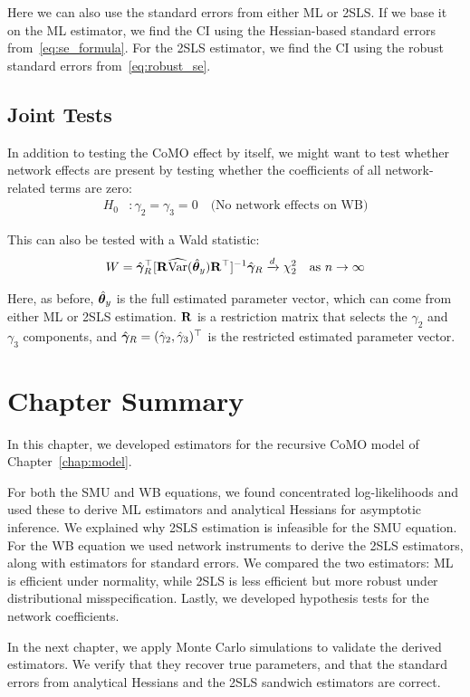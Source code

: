 Here we can also use the standard errors from either ML or 2SLS\@. If we base it on the ML estimator, we find the CI using the Hessian-based standard errors from~\eqref{eq:se_formula}. For the 2SLS estimator, we find the CI using the robust standard errors from~\eqref{eq:robust_se}.

\subsection{Joint Tests}

In addition to testing the CoMO effect by itself, we might want to test whether network effects are present by testing whether the coefficients of all network-related terms are zero:
\begin{align}
    H_0&: \gamma_2 = \gamma_3 = 0 \quad \text{(No network effects on WB)}
\end{align}

This can also be tested with a Wald statistic:
\begin{equation}
    W = \hat{\bm{\gamma}}_R^\top[\mathbf{R}\widehat{\operatorname{Var}}(\hat{\bm{\theta}}_y)\mathbf{R}^\top]^{-1}\hat{\bm{\gamma}}_R \xrightarrow{d} \chi^2_2 \quad \text{as } n \to \infty
\end{equation}

Here, as before, $\hat{\bm{\theta}}_y$ is the full estimated parameter vector, which can come from either ML or 2SLS estimation. $\mathbf{R}$ is a restriction matrix that selects the $\gamma_2$ and $\gamma_3$ components, and $\hat{\bm{\gamma}}_R = (\hat\gamma_2, \hat\gamma_3)^\top$ is the restricted estimated parameter vector.

\section{Chapter Summary}
\label{sec:est:summary}
In this chapter, we developed estimators for the recursive CoMO model of Chapter~\ref{chap:model}.

For both the SMU and WB equations, we found concentrated log-likelihoods and used these to derive ML estimators and analytical Hessians for asymptotic inference. We explained why 2SLS estimation is infeasible for the SMU equation. For the WB equation we used network instruments to derive the 2SLS estimators, along with estimators for standard errors. We compared the two estimators: ML is efficient under normality, while 2SLS is less efficient but more robust under distributional misspecification. Lastly, we developed hypothesis tests for the network coefficients.

In the next chapter, we apply Monte Carlo simulations to validate the derived estimators. We verify that they recover true parameters, and that the standard errors from analytical Hessians and the 2SLS sandwich estimators are correct.
